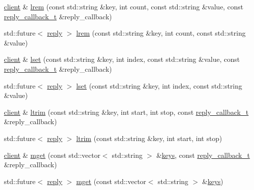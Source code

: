 \begin{DoxyCompactItemize}
\item 
\hyperlink{classcpp__redis_1_1client}{client} \& \hyperlink{classcpp__redis_1_1client_a26d934d6fd06503d8727969be5ebb043}{lrem} (const std\+::string \&key, int count, const std\+::string \&value, const \hyperlink{classcpp__redis_1_1client_a061a1140d36d2eaeda82b09a0bb3f9f2}{reply\+\_\+callback\+\_\+t} \&reply\+\_\+callback)
\item 
std\+::future$<$ \hyperlink{classcpp__redis_1_1reply}{reply} $>$ \hyperlink{classcpp__redis_1_1client_a6581856beb86e871feb42d703cd1824a}{lrem} (const std\+::string \&key, int count, const std\+::string \&value)
\item 
\hyperlink{classcpp__redis_1_1client}{client} \& \hyperlink{classcpp__redis_1_1client_a98e469104f97332c785d4c2f3d15150e}{lset} (const std\+::string \&key, int index, const std\+::string \&value, const \hyperlink{classcpp__redis_1_1client_a061a1140d36d2eaeda82b09a0bb3f9f2}{reply\+\_\+callback\+\_\+t} \&reply\+\_\+callback)
\item 
std\+::future$<$ \hyperlink{classcpp__redis_1_1reply}{reply} $>$ \hyperlink{classcpp__redis_1_1client_a4c0d3955450ed6bda887688c863baa72}{lset} (const std\+::string \&key, int index, const std\+::string \&value)
\item 
\hyperlink{classcpp__redis_1_1client}{client} \& \hyperlink{classcpp__redis_1_1client_af82304129513a073988583fcfa4210fe}{ltrim} (const std\+::string \&key, int start, int stop, const \hyperlink{classcpp__redis_1_1client_a061a1140d36d2eaeda82b09a0bb3f9f2}{reply\+\_\+callback\+\_\+t} \&reply\+\_\+callback)
\item 
std\+::future$<$ \hyperlink{classcpp__redis_1_1reply}{reply} $>$ \hyperlink{classcpp__redis_1_1client_af14f81093a0e6e45d958e9b7a5ed9c16}{ltrim} (const std\+::string \&key, int start, int stop)
\item 
\hyperlink{classcpp__redis_1_1client}{client} \& \hyperlink{classcpp__redis_1_1client_a946b590d9a2a29ee6ae1971b9208a241}{mget} (const std\+::vector$<$ std\+::string $>$ \&\hyperlink{classcpp__redis_1_1client_acb7845a206b2321e6919c2f38282c322}{keys}, const \hyperlink{classcpp__redis_1_1client_a061a1140d36d2eaeda82b09a0bb3f9f2}{reply\+\_\+callback\+\_\+t} \&reply\+\_\+callback)
\item 
std\+::future$<$ \hyperlink{classcpp__redis_1_1reply}{reply} $>$ \hyperlink{classcpp__redis_1_1client_a8c08062c8414fd72d1a0b3ef4f44d89d}{mget} (const std\+::vector$<$ std\+::string $>$ \&\hyperlink{classcpp__redis_1_1client_acb7845a206b2321e6919c2f38282c322}{keys})
\item 

\end{DoxyCompactItemize}
